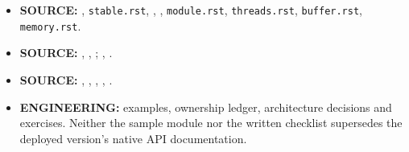 \documentclass[
  11pt,
]{report}
\newcommand{\passthrough}[1]{#1}
\providecommand{\tightlist}{%
  \setlength{\itemsep}{0pt}\setlength{\parskip}{0pt}}
\begin{document}
\begin{itemize}
\tightlist
\item
  \textbf{SOURCE:} ,
  \passthrough{\lstinline!stable.rst!},
  ,
  ,
  \passthrough{\lstinline!module.rst!},
  \passthrough{\lstinline!threads.rst!},
  \passthrough{\lstinline!buffer.rst!},
  \passthrough{\lstinline!memory.rst!}.
\item
  \textbf{SOURCE:}
  ,
  ,
  ;
  ,
  .
\item
  \textbf{SOURCE:} ,
  ,
  ,
  ,
  .
\item
  \textbf{ENGINEERING:} examples, ownership ledger, architecture
  decisions and exercises. Neither the sample module nor the written
  checklist supersedes the deployed version's native API documentation.
\end{itemize}
\end{document}
